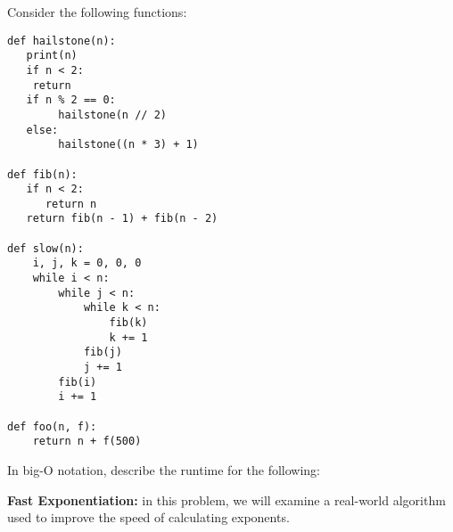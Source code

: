 \documentclass{exam}
\begin{document}
\begin{questions}
\begin{parts}
\end{parts}

\begin{blocksection}
\question Consider the following functions: 
\begin{lstlisting}
def hailstone(n):
   print(n)
   if n < 2:
    return
   if n % 2 == 0:
        hailstone(n // 2)
   else:
        hailstone((n * 3) + 1)

def fib(n):
   if n < 2:
      return n
   return fib(n - 1) + fib(n - 2)

def slow(n):
    i, j, k = 0, 0, 0
    while i < n:
        while j < n:
            while k < n:
                fib(k)
                k += 1
            fib(j)
            j += 1
        fib(i)
        i += 1

def foo(n, f):
    return n + f(500)
\end{lstlisting}
In big-O notation, describe the runtime for the following:

\end{blocksection}

\begin{blocksection}
\question \textbf{Fast Exponentiation:} in this problem, we will examine a
real-world algorithm used to improve the speed of calculating exponents.

\end{blocksection}
\end{questions}
\end{document}
